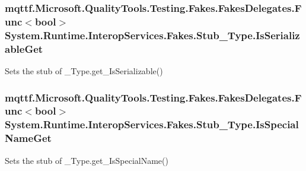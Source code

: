 \hypertarget{class_system_1_1_runtime_1_1_interop_services_1_1_fakes_1_1_stub___type_a018fa26875ea7cd6583c6b1005516763}{
\subsubsection[{Is\-Serializable\-Get}]{\setlength{\rightskip}{0pt plus 5cm}mqttf.\-Microsoft.\-Quality\-Tools.\-Testing.\-Fakes.\-Fakes\-Delegates.\-Func$<$bool$>$ System.\-Runtime.\-Interop\-Services.\-Fakes.\-Stub\-\_\-\-Type.\-Is\-Serializable\-Get}}\label{class_system_1_1_runtime_1_1_interop_services_1_1_fakes_1_1_stub___type_a018fa26875ea7cd6583c6b1005516763}


Sets the stub of \-\_\-\-Type.\-get\-\_\-\-Is\-Serializable()

\hypertarget{class_system_1_1_runtime_1_1_interop_services_1_1_fakes_1_1_stub___type_a7b38a29c562097585948e02b76d022b8}{
\subsubsection[{Is\-Special\-Name\-Get}]{\setlength{\rightskip}{0pt plus 5cm}mqttf.\-Microsoft.\-Quality\-Tools.\-Testing.\-Fakes.\-Fakes\-Delegates.\-Func$<$bool$>$ System.\-Runtime.\-Interop\-Services.\-Fakes.\-Stub\-\_\-\-Type.\-Is\-Special\-Name\-Get}}\label{class_system_1_1_runtime_1_1_interop_services_1_1_fakes_1_1_stub___type_a7b38a29c562097585948e02b76d022b8}


Sets the stub of \-\_\-\-Type.\-get\-\_\-\-Is\-Special\-Name()

